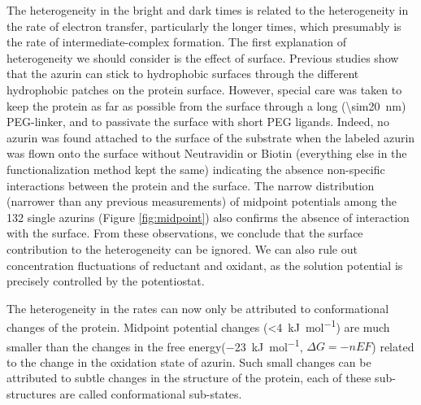 The heterogeneity in the bright and dark times is related to the heterogeneity in the rate of electron transfer, particularly the longer times, which presumably is the rate of intermediate-complex formation.
The first explanation of heterogeneity we should consider is the effect of surface.
Previous studies show that the azurin can stick to hydrophobic surfaces through the different hydrophobic patches on the protein surface.\cite{patil2010visualizing,salverda2010fluorescent,akkilic2014chemically-induced}
However, special care was taken to keep the protein as far as possible from the surface through a long (\SI{\sim20}{\nm}) PEG-linker, and to passivate the surface with short PEG ligands.
Indeed, no azurin was found attached to the surface of the substrate when the labeled azurin was flown onto the surface without Neutravidin or Biotin (everything else in the functionalization method kept the same) indicating the absence non-specific interactions between the protein and the surface.
The narrow distribution (narrower than any previous measurements) of midpoint potentials among the 132 single azurins (Figure \ref{fig:midpoint}) also confirms the absence of interaction with the surface.
From these observations, we conclude that the surface contribution to the heterogeneity can be ignored.
We can also rule out concentration fluctuations of reductant and oxidant, as the solution potential is precisely controlled by the potentiostat.


The heterogeneity in the rates can now only be attributed to conformational changes of the protein.
Midpoint potential changes (\SI{<4}{\kJ\per\mole}) are much smaller than the changes in the free energy(\SI{-23}{\kJ\per\mole}, $\Delta{G}=-nEF$) related to the change in the oxidation state of azurin. Such small changes can be attributed to subtle changes in the structure of the protein, each of these sub-structures are called conformational sub-states. %


